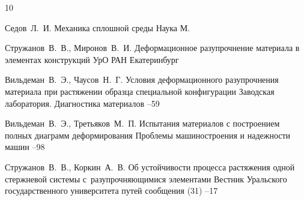 \begin{thebibliography}{10}

\by Седов~Л.~И.
\book Механика сплошной среды
\publ Наука
\publaddr М.

\by Стружанов~В.~В., Миронов~В.~И.
\book Деформационное разупрочнение материала в элементах конструкций
\publ УрО РАН 
\publaddr Екатеринбург

\by Вильдеман~В.~Э., Чаусов~Н.~Г.
\paper Условия деформационного разупрочнения материала при растяжении образца специальной конфигурации
\jour Заводская лаборатория. Диагностика материалов
--59

\by Вильдеман~В.~Э., Третьяков~М.~П.
\paper Испытания материалов с построением полных диаграмм деформирования
\jour Проблемы машиностроения и надежности машин
\vol 
{}
--98

\by Стружанов~В.~В., Коркин~А.~В.
\paper Об устойчивости процесса растяжения одной стержневой системы с~разупрочняющимися элементами
\jour Вестник Уральского государственного университета путей сообщения
(31)
--17


\end{thebibliography}
